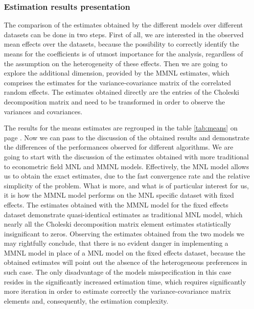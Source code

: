 \documentclass[12pt,]{article}
\begin{document}
\hypertarget{estimation-results-presentation}{%
\subsubsection{Estimation results
presentation}\label{estimation-results-presentation}}

The comparison of the estimates obtained by the different models over
different datasets can be done in two steps. First of all, we are
interested in the observed mean effects over the datasets, because the
possibility to correctly identify the means for the coefficients is of
utmost importance for the analysis, regardless of the assumption on the
heterogeneity of these effects. Then we are going to explore the
additional dimension, provided by the MMNL estimates, which comprises
the estimates for the variance-covariance matrix of the correlated
random effects. The estimates obtained directly are the entries of the
Choleski decomposition matrix and need to be transformed in order to
observe the variances and covariances.

The results for the means estimates are regrouped in the table
\ref{tab:means} on page \pageref{tab:means}. Now we can pass to the
discussion of the obtained results and demonstrate the differences of
the performances observed for different algorithms. We are going to
start with the discussion of the estimates obtained with more
traditional to econometric field MNL and MMNL models. Effectively, the
MNL model allows us to obtain the exact estimates, due to the fast
convergence rate and the relative simplicity of the problem. What is
more, and what is of particular interest for us, it is how the MMNL
model performs on the MNL specific dataset with fixed effects. The
estimates obtained with the MMNL model for the fixed effects dataset
demonstrate quasi-identical estimates as traditional MNL model, which
nearly all the Choleski decomposition matrix element estimates
statistically insignificant to zeros. Observing the estimates obtained
from the two models we may rightfully conclude, that there is no evident
danger in implementing a MMNL model in place of a MNL model on the fixed
effects dataset, because the obtained estimates will point out the
absence of the heterogeneous preferences in such case. The only
disadvantage of the models misspecification in this case resides in the
significantly increased estimation time, which requires significantly
more iteration in order to estimate correctly the variance-covariance
matrix elements and, consequently, the estimation complexity.
\end{document}
